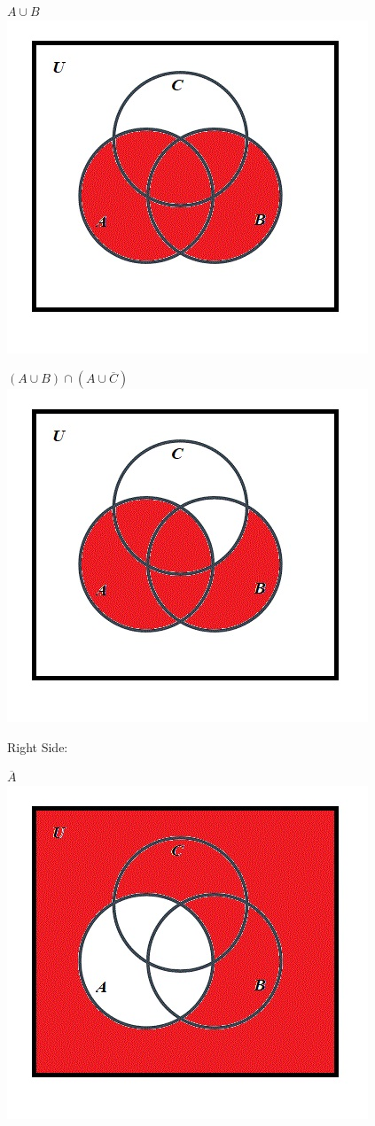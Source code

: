 \documentclass[10pt]{article}
\begin{document}
$A \cup B$\\
\includegraphics[scale=0.55]{32}

$(A \cup B) \cap (A \cup \overline{C})$\\
\includegraphics[scale=0.55]{33}

Right Side:

$\overline{A}$\\
\includegraphics[scale=0.55]{34}
\end{document}
